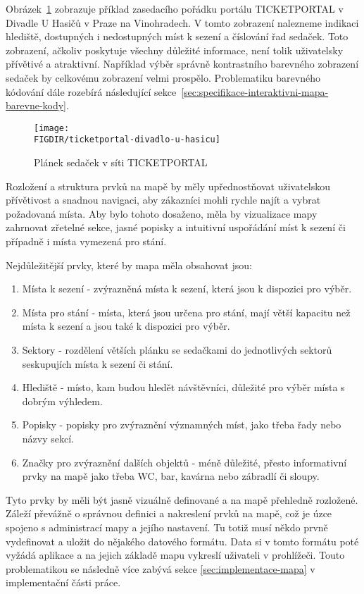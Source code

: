 Obrázek~\ref{fig:venue-map-visualization-layout-and-structure} zobrazuje příklad zasedacího pořádku portálu TICKETPORTAL v Divadle U Hasičů v Praze na Vinohradech.
V tomto zobrazení nalezneme indikaci hlediště, dostupných i nedostupných míst k sezení a číslování řad sedaček.
Toto zobrazení, ačkoliv poskytuje všechny důležité informace, není tolik uživatelsky přívětivé a atraktivní.
Například výběr správně kontrastního barevného zobrazení sedaček by celkovému zobrazení velmi prospělo.
Problematiku barevného kódování dále rozebírá následující sekce~\ref{sec:specifikace-interaktivni-mapa-barevne-kody}.

\begin{figure}[H]
    \texttt{[image: \\FIGDIR/ticketportal-divadlo-u-hasicu]}
    \centering
    \caption{Plánek sedaček v síti TICKETPORTAL}
    \label{fig:venue-map-visualization-layout-and-structure}
\end{figure}

Rozložení a struktura prvků na mapě by měly upřednostňovat uživatelskou přívětivost a snadnou navigaci, aby zákazníci mohli rychle najít a vybrat požadovaná místa.
Aby bylo tohoto dosaženo, měla by vizualizace mapy zahrnovat zřetelné sekce, jasné popisky a intuitivní uspořádání míst k sezení či případně i místa vymezená pro stání.

Nejdůležitější prvky, které by mapa měla obsahovat jsou:
\begin{enumerate}
    \item Místa k sezení - zvýrazněná místa k sezení, která jsou k dispozici pro výběr.
    \item Místa pro stání - místa, která jsou určena pro stání, mají větší kapacitu než místa k sezení a jsou také k dispozici pro výběr.
    \item Sektory - rozdělení větších plánku se sedačkami do jednotlivých sektorů seskupujích místa k sezení či stání.
    \item Hlediště - místo, kam budou hledět návštěvníci, důležité pro výběr místa s dobrým výhledem.
    \item Popisky - popisky pro zvýraznění významných míst, jako třeba řady nebo názvy sekcí.
    \item Značky pro zvýraznění dalších objektů - méně důležité, přesto informativní prvky na mapě jako třeba WC, bar, kavárna nebo zábradlí či sloupy.
\end{enumerate}

Tyto prvky by měli být jasně vizuálně definované a na mapě přehledně rozložené.
Záleží převážně o správnou definici a nakreslení prvků na mapě, což je úzce spojeno s administrací mapy a jejího nastavení.
Tu totiž musí někdo prvně vydefinovat a uložit do nějakého datového formátu.
Data si v tomto formátu poté vyžádá aplikace a na jejich základě mapu vykreslí uživateli v prohlížeči.
Touto problematikou se následně více zabývá sekce \ref{sec:implementace-mapa} v implementační části práce.


